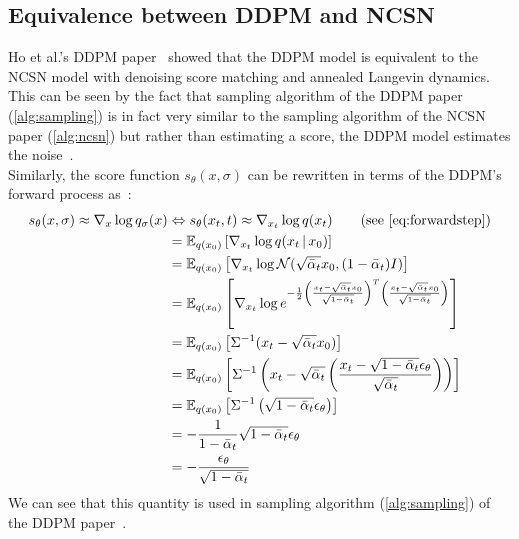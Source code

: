 \documentclass[twoside]{article}
\numberwithin{equation}{section}
\numberwithin{figure}{section}
\begin{document}
\subsection{Equivalence between DDPM and NCSN}
Ho et al.'s DDPM paper~\cite{ho2020denoising} showed that the DDPM model is equivalent to the NCSN model with denoising score matching and annealed Langevin dynamics. \\
This can be seen by the fact that sampling algorithm of the DDPM paper (\ref{alg:sampling}) is in fact very similar to the sampling algorithm of the NCSN paper (\ref{alg:ncsn}) but rather than estimating a score, the DDPM model estimates the noise~\cite{ho2020denoising}. \\
Similarly, the score function $s_\theta (x, \sigma)$ can be rewritten in terms of the DDPM's forward process as~\cite{weng2021diffusion}:
{
  \allowdisplaybreaks
  \begin{align}
    s_\theta (x, \sigma) \approx \nabla_x \log q_\sigma (x) &\Leftrightarrow s_\theta (x_t, t) \approx \nabla_{x_t} \log q(x_t) \qquad \text{(see \ref{eq:forwardstep})} \label{eq:scoreestimation} \\
    &= \mathbb{E}_{q (x_0)} \left[ \nabla_{x_t} \log q(x_t \, | \, x_0) \right] \\
    &= \mathbb{E}_{q (x_0)} \left[ \nabla_{x_t} \log \mathcal{N} (\sqrt{\bar{\alpha}_t} x_0, (1 - \bar{\alpha}_t) I) \right] \\
    &= \mathbb{E}_{q (x_0)} \left[ \nabla_{x_t} \log e^{- \frac{1}{2} \left( \frac{x_t - \sqrt{\bar{\alpha}_t} x_0}{\sqrt{1 - \bar{\alpha}_t}} \right)^T \left( \frac{x_t - \sqrt{\bar{\alpha}_t} x_0}{\sqrt{1 - \bar{\alpha}_t}} \right)} \right] \\
    &= \mathbb{E}_{q (x_0)} \left[ \Sigma^{-1} (x_t - \sqrt{\bar{\alpha}_t} x_0) \right] \\
    &= \mathbb{E}_{q (x_0)} \left[ \Sigma^{-1} \left(x_t - \sqrt{\bar{\alpha}_t} \left( \frac{x_t - \sqrt{1 - \bar{\alpha}_t} \epsilon_\theta}{\sqrt{\bar{\alpha}_t}} \right) \right) \right] \\
    &= \mathbb{E}_{q (x_0)} \left[ \Sigma^{-1} \left( \sqrt{1 - \bar{\alpha}_t} \epsilon_\theta \right) \right] \\
    &= - \frac{1}{1 - \bar{\alpha}_t}  \sqrt{1 - \bar{\alpha}_t} \epsilon_\theta \\
    &= - \frac{\epsilon_\theta}{\sqrt{1 - \bar{\alpha}_t}}
  \end{align}
  We can see that this quantity is used in sampling algorithm (\ref{alg:sampling}) of the DDPM paper~\cite{ho2020denoising}. 
}
\end{document}

